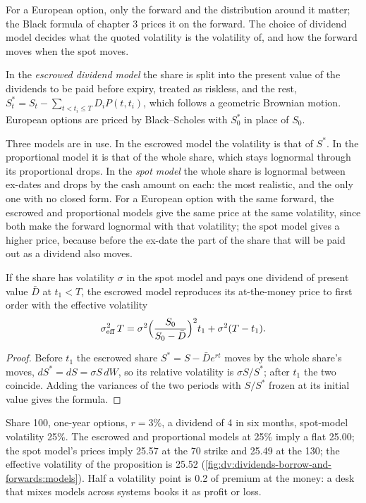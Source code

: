 For a European option, only the forward and the distribution around it matter; the
Black formula of chapter 3 prices it on the forward. The choice of dividend model
decides what the quoted volatility is the volatility of, and how the forward moves
when the spot moves.

\begin{definition}\label{def:dv:dividends-borrow-and-forwards:escrowed}
In the \emph{escrowed dividend model} the share is
split into the present value of the dividends to be paid before expiry, treated as
riskless, and the rest, $S^*_t=S_t-\sum_{t<t_i\le T}D_iP(t,t_i)$, which follows a
geometric Brownian motion. European options are priced by Black--Scholes with
$S^*_0$ in place of $S_0$.
\end{definition}

Three models are in use. In the escrowed model the volatility is that of $S^*$.
In the proportional model it is that of the whole share, which stays lognormal
through its proportional drops. In the \emph{spot model} the whole share is
lognormal between ex-dates and drops by the cash amount on each: the most
realistic, and the only one with no closed form. For a European option with the
same forward, the escrowed and proportional models give the same price at the same
volatility, since both make the forward lognormal with that volatility; the spot
model gives a higher price, because before the ex-date the part of the share that
will be paid out as a dividend also moves.

\begin{proposition}\label{prop:dv:dividends-borrow-and-forwards:adj}
If the share has volatility $\sigma$ in the spot model and pays one dividend of
present value $\bar D$ at $t_1<T$, the escrowed model reproduces its at-the-money
price to first order with the effective volatility
\[
\sigma_{\mathrm{eff}}^2\,T=\sigma^2\Bigl(\frac{S_0}{S_0-\bar D}\Bigr)^2t_1+\sigma^2(T-t_1).
\]
\end{proposition}
\begin{proof}
Before $t_1$ the escrowed share $S^*=S-\bar D e^{rt}$ moves by the whole share's
moves, $dS^*=dS=\sigma S\,dW$, so its relative volatility is $\sigma S/S^*$; after
$t_1$ the two coincide. Adding the variances of the two periods with $S/S^*$ frozen
at its initial value gives the formula.
\end{proof}

\begin{example}\label{ex:dv:dividends-borrow-and-forwards:adj}
Share 100, one-year options, $r=3\%$, a dividend of 4 in six months, spot-model
volatility 25\%. The escrowed and proportional models at 25\% imply a flat 25.00;
the spot model's prices imply 25.57 at the 70 strike and 25.49 at the 130; the
effective volatility of the proposition is 25.52
(\cref{fig:dv:dividends-borrow-and-forwards:models}). Half a volatility point is
0.2 of premium at the money: a desk that mixes models across systems books it as
profit or loss.
\end{example}

